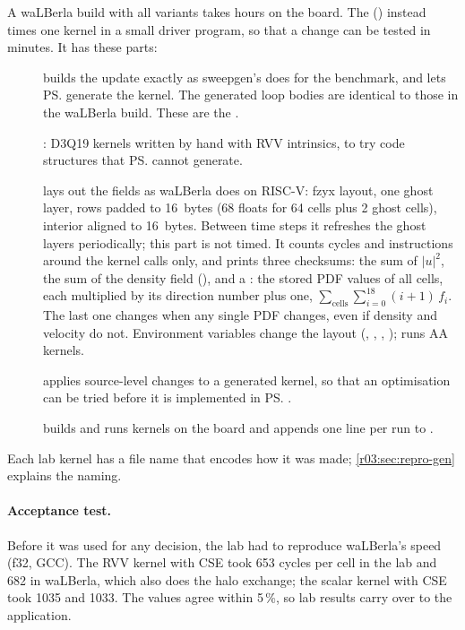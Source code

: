 A waLBerla build with all variants takes hours on the board. The 
() instead times one kernel in a small driver program, so that a
change can be tested in minutes. It has these parts:
\begin{description}
  \item[] builds the update exactly as sweepgen's 
        does for the benchmark, and lets \ps{} generate the kernel. The generated loop bodies
        are identical to those in the waLBerla build. These are the .
  \item[] : D3Q19 kernels written by hand
        with RVV intrinsics, to try code structures that \ps{} cannot generate.
  \item[] lays out the fields as waLBerla does on RISC-V:
        fzyx layout, one ghost layer, rows padded to 16~bytes (68 floats for 64 cells plus 2
        ghost cells), interior aligned to 16~bytes. Between time steps it refreshes the ghost
        layers periodically; this part is not timed. It counts cycles and instructions around
        the kernel calls only, and prints three checksums: the sum of $|u|^2$, the sum of the
        density field (), and a : the stored PDF values of
        all cells, each multiplied by its direction number plus one, $\sum_{\text{cells}}
        \sum_{i=0}^{18} (i+1)\,f_i$. The last one changes when any single PDF changes, even
        if density and velocity do not. Environment variables change the layout (,
        , , );  runs AA kernels.
  \item[] applies source-level changes to a generated kernel,
        so that an optimisation can be tried before it is implemented in \ps{}.
  \item[] builds and runs kernels on the board and appends one
        line per run to .
\end{description}
Each lab kernel has a file name that encodes how it was made; \cref{r03:sec:repro-gen}
explains the naming.

\paragraph{Acceptance test.} Before it was used for any decision, the lab had to reproduce
waLBerla's speed (f32, GCC). The RVV kernel with CSE took 653 cycles per cell in the lab and
682 in waLBerla, which also does the halo exchange; the scalar kernel with CSE took 1035 and
1033. The values agree within 5\,\%, so lab results carry over to the application.

